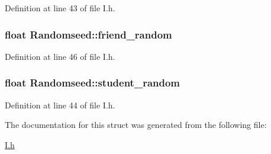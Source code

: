 \-Definition at line 43 of file \-I.\-h.

\hypertarget{structRandomseed_ae9732631faf4b6b3a9ae84acd376018b}{
\subsubsection[{friend\-\_\-random}]{\setlength{\rightskip}{0pt plus 5cm}float {\bf \-Randomseed\-::friend\-\_\-random}}}\label{structRandomseed_ae9732631faf4b6b3a9ae84acd376018b}


\-Definition at line 46 of file \-I.\-h.

\hypertarget{structRandomseed_a1899a992402df09882ff75b251135222}{
\subsubsection[{student\-\_\-random}]{\setlength{\rightskip}{0pt plus 5cm}float {\bf \-Randomseed\-::student\-\_\-random}}}\label{structRandomseed_a1899a992402df09882ff75b251135222}


\-Definition at line 44 of file \-I.\-h.



\-The documentation for this struct was generated from the following file\-:\begin{DoxyCompactItemize}
\item 
\hyperlink{I_8h}{\-I.\-h}\end{DoxyCompactItemize}

